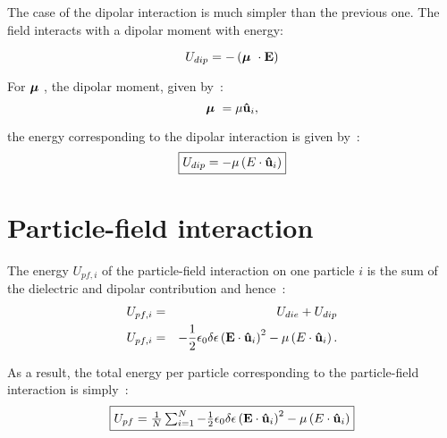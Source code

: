 The case of the dipolar interaction is much simpler than the previous one. The field interacts
with a dipolar moment with energy:

\begin{equation}
	U_{dip} = -\left( \mbox{\boldmath $\mu$ } \cdot \mathbf{E} \right)
\end{equation}

For $\mbox{\boldmath $\mu$ }$, the dipolar moment, given by~:
\begin{equation}
	\mbox{\boldmath $\mu$ } = \mu\mathbf{\hat{u} }_i,
\end{equation}

the energy corresponding to the dipolar interaction is given by~:
\begin{equation}
	\fbox{$U_{dip} = -\mu\left( E \cdot \mathbf{\hat{u} }_i \right)$}
\end{equation}

\section{Particle-field interaction}


The energy $U_{pf,i}$ of the particle-field interaction on one particle $i$ is the sum of 
the dielectric and dipolar contribution and hence~:
\begin{eqnarray}
	U_{pf,i} &=& U_{die} + U_{dip}	 \\
	U_{pf,i} &=& -\frac{1}{2}\epsilon_0\delta\epsilon\left( \mathbf{E} \cdot \mathbf{\hat{u} }_i \right)^2
		-\mu\left( E \cdot \mathbf{\hat{u} }_i \right).
\end{eqnarray}

As a result, the total energy per particle corresponding to the particle-field interaction 
is simply~:
\begin{equation}
	\fbox{$U_{pf} = \frac{1}{N}\sum^{N}_{i=1} -\frac{1}{2}\epsilon_0\delta\epsilon\left( \mathbf{E} \cdot \mathbf{\hat{u} }_i \right)^2
		-\mu\left( E \cdot \mathbf{\hat{u} }_i \right)$}
\end{equation}




